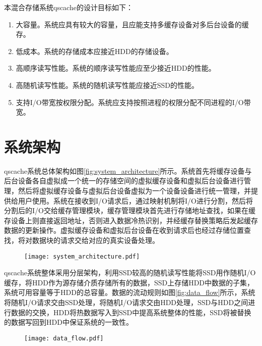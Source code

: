 本混合存储系统qscache的设计目标如下：

\begin{enumerate}
    \item 大容量。系统应具有较大的容量，且应能支持多缓存设备对多后台设备的缓存。
    \item 低成本。系统的存储成本应接近HDD的存储设备。
    \item 高顺序读写性能。系统的顺序读写性能应至少接近HDD的性能。
    \item 高随机读写性能。系统的随机读写性能应接近SSD的性能。
    \item 支持I/O带宽按权限分配。系统应支持按照进程的权限分配不同进程的I/O带宽。

\end{enumerate}

\section{系统架构}
\label{sec:qscache_architecture}

qscache系统总体架构如图\ref{fig:system_architecture}所示。系统首先将缓存设备与后台设备各自虚拟成一个统一的存储空间的虚拟缓存设备和虚拟后台设备进行管理，然后将虚拟缓存设备与虚拟后台设备虚拟为一个设备设备进行统一管理，并提供给用户使用。系统在接收到I/O请求后，通过映射机制将I/O进行分割，然后将分割后的I/O交给缓存管理模块，缓存管理模块首先进行存储地址查找，如果在缓存设备上则直接返回地址，否则进入数据冷热识别，并经缓存替换策略后发起缓存数据的更新操作。虚拟缓存设备和虚拟后台设备在收到请求后也经过存储位置查找，将对数据块的请求交给对应的真实设备处理。

\begin{figure}[H]
    \centering
    \texttt{[image: system\_architecture.pdf]}
\end{figure}

qscache系统整体采用分层架构，利用SSD较高的随机读写性能将SSD用作随机I/O缓存，将HDD作为源存储介质存储所有的数据，SSD上存储HDD中数据的子集，系统可用容量等于HDD的总容量。数据的流动规则如图\ref{fig:data_flow}所示，系统将随机I/O请求交由SSD处理，将随机I/O请求交由HDD处理，SSD与HDD之间进行数据的交换，HDD将热数据写入到SSD中提高系统整体的性能，SSD将被替换的数据写回到HDD中保证系统的一致性。

\begin{figure}[H]
    \centering
    \texttt{[image: data\_flow.pdf]}
\end{figure}

